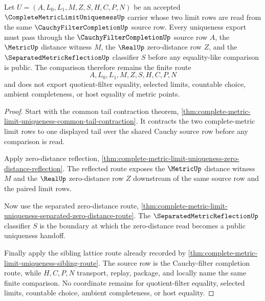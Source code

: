 \begin{theorem}
\label{thm:complete-metric-limit-uniqueness-cauchy-filter-comparison}
Let $U=(A,L_{0},L_{1},M,Z,S,H,C,P,N)$ be an accepted $\CompleteMetricLimitUniquenessUp$ carrier whose two limit rows are read from the same $\CauchyFilterCompletionUp$ source row. Every uniqueness export must pass through the $\CauchyFilterCompletionUp$ source row $A$, the $\MetricUp$ distance witness $M$, the $\RealUp$ zero-distance row $Z$, and the $\SeparatedMetricReflectionUp$ classifier $S$ before any equality-like comparison is public. The comparison therefore remains the finite route
$$
A,L_{0},L_{1},M,Z,S,H,C,P,N
$$
and does not export quotient-filter equality, selected limits, countable choice, ambient completeness, or host equality of metric points.
\end{theorem}
\begin{proof}
Start with the common tail contraction theorem, \autoref{thm:complete-metric-limit-uniqueness-common-tail-contraction}. It contracts the two complete-metric limit rows to one displayed tail over the shared Cauchy source row before any comparison is read.

Apply zero-distance reflection, \autoref{thm:complete-metric-limit-uniqueness-zero-distance-reflection}. The reflected route exposes the $\MetricUp$ distance witness $M$ and the $\RealUp$ zero-distance row $Z$ downstream of the same source row and the paired limit rows.

Now use the separated zero-distance route, \autoref{thm:complete-metric-limit-uniqueness-separated-zero-distance-route}. The $\SeparatedMetricReflectionUp$ classifier $S$ is the boundary at which the zero-distance read becomes a public uniqueness handoff.

Finally apply the sibling lattice route already recorded by \autoref{thm:complete-metric-limit-uniqueness-sibling-route}. The source row is the Cauchy-filter completion route, while $H,C,P,N$ transport, replay, package, and locally name the same finite comparison. No coordinate remains for quotient-filter equality, selected limits, countable choice, ambient completeness, or host equality.
\end{proof}

